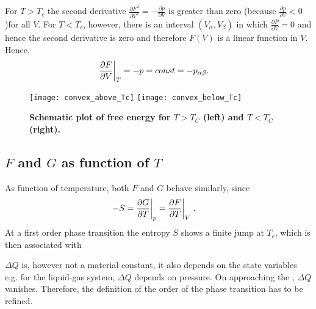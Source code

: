 For $T>T_{c}$ the second derivative $\frac{\partial F^{2}}{\partial V^{2}}=-\frac{\partial p}{\partial V}$ is greater than zero (because $\frac{\partial p}{\partial V}<0$)for all $V$.
For $T<T_{c}$, however, there is an interval $(V_{\alpha},V_{\beta})$ in which $\frac{\partial P}{\partial V}=0$ and hence the second derivative is zero and therefore $F(V)$ is a linear function in $V$. Hence,
%
\begin{align*}
\frac{\partial F}{\partial V}\bigg|_{T} &= -p = const = -p_{\alpha\beta}.
\end{align*}
% 

\begin{figure}[ht]
\begin{center}
\texttt{[image: convex\_above\_Tc]}
\hfill
\texttt{[image: convex\_below\_Tc]}
\caption{{\bf Schematic plot of free energy for $T>T_{C}$ (left) and $T<T_{C}$ (right).}}
\end{center}
\end{figure}


%


\subsection{$F$ and $G$ as function of $T$}

As function of temperature, both $F$ and $G$ behave similarly, since
%
\begin{align*}
-S&=\frac{\partial G}{\partial T}\bigg|_{p}=\frac{\partial F}{\partial T}\bigg|_{V}\;.
\end{align*}
%
At a first order phase transition the entropy $S$ shows a finite jump at $T_{c}$,
which is then associated with 

$\Delta Q$ is, however not a material constant, it also depends on the state variables e.g.
for the liquid-gas system, $\Delta Q$ depends on pressure. On approaching the ,
$\Delta Q$ vanishes. Therefore, the definition of the order of the phase transition has to be refined.
